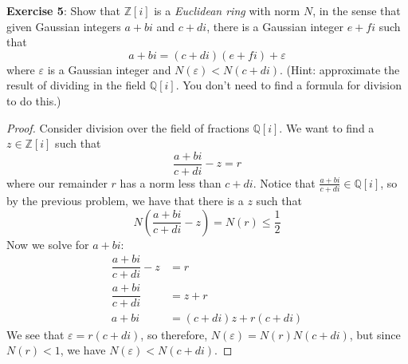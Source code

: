 \documentclass{article}
\begin{document}
\textbf{Exercise 5}: Show that $\mathbb{Z}[i]$ is a \textit{Euclidean ring} with norm $N$, in the sense that given Gaussian integers $a + bi$ and $c + di$, there is a Gaussian integer $e + fi$ such that
    \begin{equation*}
        a + bi = (c + di)(e + fi) + \varepsilon
    \end{equation*}
where $\varepsilon$ is a Gaussian integer and $N(\varepsilon) < N(c + di)$. (Hint: approximate the result of dividing in the field $\mathbb{Q}[i]$. You don't need to find a formula for division to do this.)
    \begin{proof}
        Consider division over the field of fractions $\mathbb{Q}[i]$. We want to find a $z \in \mathbb{Z}[i]$ such that
            \begin{equation*}
                \dfrac{a + bi}{c + di} - z = r
            \end{equation*}
        where our remainder $r$ has a norm less than $c + di$. Notice that $\frac{a + bi}{c + di} \in \mathbb{Q}[i]$, so by the previous problem, we have that there is a $z$ such that
            \begin{equation*}
                N\left(\dfrac{a + bi}{c + di} - z\right) = N(r) \leq \dfrac{1}{2}
            \end{equation*}
        Now we solve for $a + bi$:
            \begin{align*}
                \dfrac{a + bi}{c + di} - z &= r                     \\
                \dfrac{a + bi}{c + di}     &= z + r                 \\
                a + bi                     &= (c + di)z + r(c + di)   
            \end{align*}
        We see that $\varepsilon = r(c + di)$, so therefore, $N(\varepsilon) = N(r)N(c + di)$, but since $N(r) < 1$, we have $N(\varepsilon) < N(c + di)$.
    \end{proof}
\end{document}
